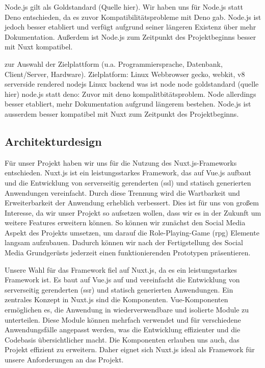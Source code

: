 \documentclass[a4paper,12pt]{article}
\begin{document}
Node.js gilt als Goldstandard (Quelle hier). Wir haben uns für Node.js statt Deno entschieden, da es zuvor Kompatibilitätsprobleme mit Deno gab. Node.js ist jedoch besser etabliert und verfügt aufgrund seiner längeren Existenz über mehr Dokumentation. Außerdem ist Node.js zum Zeitpunkt des Projektbeginns besser mit Nuxt kompatibel.


zur Auswahl der Zielplattform (u.a. Programmiersprache, Datenbank,
Client/Server, Hardware).
Zielplatform: Linux 
Webbrowser 
gecko, webkit, v8 serverside rendered 
nodejs Linux backend
was ist node node goldstandard (quelle hier) 
node.js statt deno: Zuvor mit deno kompalitbitätsproblem. Node allerdings besser etabliert, mehr Dokumentation aufgrund längerem bestehen. Node.js ist ausserdem besser kompatibel mit Nuxt zum Zeitpunkt des Projektbeginns. 


\subsection{Architekturdesign}
Für unser Projekt haben wir uns für die Nutzung des Nuxt.js-Frameworks entschieden. Nuxt.js ist ein leistungsstarkes Framework, das auf Vue.js aufbaut und die Entwicklung von serverseitig gerenderten (\gls{ssl}) und statisch generierten Anwendungen vereinfacht. Durch diese Trennung wird die Wartbarkeit und Erweiterbarkeit der Anwendung erheblich verbessert. Dies ist für uns von großem Interesse, da wir unser Projekt so aufsetzen wollen, dass wir es in der Zukunft um weitere Features erweitern können. So können wir zunächst den Social Media Aspekt des Projekts umsetzen, um darauf die Role-Playing-Game (\gls{rpg}) Elemente langsam aufzubauen. Dadurch können wir nach der Fertigstellung des Social Media Grundgerüsts jederzeit einen funktionierenden Prototypen präsentieren.

Unsere Wahl für das Framework fiel auf Nuxt.js, da es ein leistungsstarkes Framework ist. Es baut auf Vue.js auf und vereinfacht die Entwicklung von serverseitig gerenderten (\gls{ssr}) und statisch generierten Anwendungen. Ein zentrales Konzept in Nuxt.js sind die Komponenten. Vue-Komponenten ermöglichen es, die Anwendung in wiederverwendbare und isolierte Module zu unterteilen. Diese Module können mehrfach verwendet und für verschiedene Anwendungsfälle angepasst werden, was die Entwicklung effizienter und die Codebasis übersichtlicher macht. Die Komponenten erlauben uns auch, das Projekt effizient zu erweitern. Daher eignet sich Nuxt.js ideal als Framework für unsere Anforderungen an das Projekt.
\end{document}
